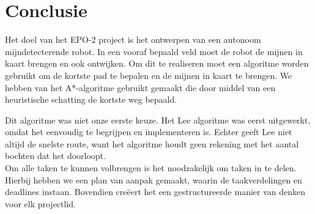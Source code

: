 \documentclass{report}
\begin{document}
\chapter{Conclusie}
\label{ch:conclusie}

Het doel van het EPO-2 project is het ontwerpen van een autonoom mijndetecterende robot. In een vooraf bepaald veld moet de robot de mijnen in kaart brengen en ook ontwijken. 
Om dit te realiseren moet een algoritme worden gebruikt om de kortste pad te bepalen en de mijnen in kaart te brengen. We hebben van het A*-algoritme gebruikt gemaakt die door middel van een heuristische schatting de kortste weg bepaald. 

Dit algoritme was niet onze eerste keuze. Het Lee algoritme was eerst uitgewerkt, omdat het eenvoudig te begrijpen en implementeren is. Echter geeft Lee niet altijd de snelste route, want het algoritme houdt geen rekening met het aantal bochten dat het doorloopt.\\


Om alle taken te kunnen volbrengen is het noodzakelijk om taken in te delen. Hierbij hebben we een plan van aanpak gemaakt, waarin de taakverdelingen en deadlines instaan. Bovendien cre\"eert het een gestructureerde manier van denken voor elk projectlid.

	
\end{document}
